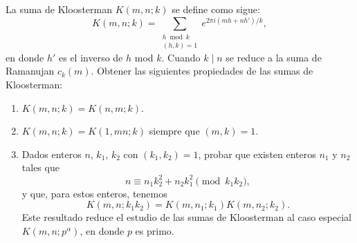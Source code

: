 \documentclass[12pt,a4paper]{book}
\begin{document}
    \begin{ejercicio}
        La suma de Kloosterman $K(m,n;k)$ se define como sigue:
        \begin{equation*}
            K(m,n;k)=\sum_{\substack{h\bmod k\\(h,k)=1}}e^{2\pi i(mh+nh')/k},
        \end{equation*}
        en donde $h'$ es el inverso de $h$ mod $k$. Cuando $k\mid n$ se reduce a la suma de
        Ramanujan $c_{k}(m)$. Obtener las siguientes propiedades de las sumas de Kloosterman:
        \begin{enumerate}
            \item[(a)] $K(m,n;k)=K(n,m;k)$.
            \item[(b)] $K(m,n;k)=K(1,mn;k)$ siempre que $(m,k)=1$.
            \item[(c)] Dados enteros $n$, $k_{1}$, $k_{2}$ con $(k_{1},k_{2})=1$, probar que existen
            enteros $n_{1}$ y $n_{2}$ tales que
            \begin{equation*}
                n\equiv n_{1}k_{2}^{2}+n_{2}k_{1}^{2}\pmod{k_{1}k_{2}},
            \end{equation*}
            y que, para estos enteros, tenemos
            \begin{equation*}
                K(m,n;k_{1}k_{2})=K(m,n_{1};k_{1})K(m,n_{2};k_{2}).
            \end{equation*}
            Este resultado reduce el estudio de las sumas de Kloosterman al caso especial
            $K(m,n;p^{\alpha})$, en donde $p$ es primo.
        \end{enumerate}
    \end{ejercicio}
\end{document}
